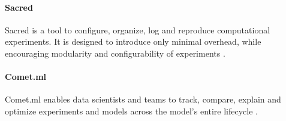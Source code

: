 \paragraph{Sacred} 

Sacred is a tool to configure, organize, log and reproduce computational experiments. It is designed to introduce only minimal overhead, while encouraging modularity and configurability of experiments \parencite{klaus_greff-proc-scipy-2017}.

\paragraph{Comet.ml}

Comet.ml enables data scientists and teams to track, compare, explain and optimize experiments and models across the model’s entire lifecycle \parencite{CometML}.


